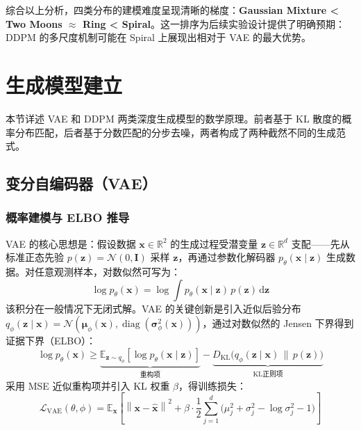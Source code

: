 \documentclass[10pt, a4paper, oneside]{ctexart}
\numberwithin{equation}{section}
\numberwithin{table}{section}
\numberwithin{figure}{section}
\newcommand{\R}{\mathbb{R}}
\newcommand{\Ncal}{\mathcal{N}}
\newcommand{\E}{\mathbb{E}}
\newcommand{\KL}{D_{\mathrm{KL}}}
\newcommand{\norm}[1]{\left\| #1 \right\|}
\newcommand{\vect}[1]{\mathbf{#1}}
\begin{document}
综合以上分析，四类分布的建模难度呈现清晰的梯度：\textbf{Gaussian Mixture < Two Moons $\approx$ Ring < Spiral}。这一排序为后续实验设计提供了明确预期：DDPM 的多尺度机制可能在 Spiral 上展现出相对于 VAE 的最大优势。

\section{生成模型建立}

本节详述 VAE 和 DDPM 两类深度生成模型的数学原理。前者基于 KL 散度的概率分布匹配，后者基于分数匹配的分步去噪，两者构成了两种截然不同的生成范式。

\subsection{变分自编码器（VAE）}

\subsubsection{概率建模与 ELBO 推导}

VAE \cite{kingma2014vae} 的核心思想是：假设数据 $\vect{x}\in\R^{2}$ 的生成过程受潜变量 $\vect{z}\in\R^{d}$ 支配——先从标准正态先验 $p(\vect{z})=\Ncal(0,\vect{I})$ 采样 $\vect{z}$，再通过参数化解码器 $p_{\theta}(\vect{x}\mid\vect{z})$ 生成数据。对任意观测样本，对数似然可写为：
\begin{equation}
    \log p_{\theta}(\vect{x}) = \log\int p_{\theta}(\vect{x}\mid\vect{z})\,p(\vect{z})\,\mathrm{d}\vect{z}
\end{equation}
该积分在一般情况下无闭式解。VAE 的关键创新是引入近似后验分布 $q_{\phi}(\vect{z}\mid\vect{x}) = \Ncal(\vect{\mu}_{\phi}(\vect{x}), \operatorname{diag}(\vect{\sigma}_{\phi}^2(\vect{x})))$，通过对数似然的 Jensen 下界得到证据下界（ELBO）：
\begin{equation}
    \log p_{\theta}(\vect{x}) \ge \underbrace{\E_{\vect{z}\sim q_{\phi}}[\log p_{\theta}(\vect{x}\mid\vect{z})]}_{\text{重构项}} - \underbrace{\KL\bigl(q_{\phi}(\vect{z}\mid\vect{x})\,\big\|\,p(\vect{z})\bigr)}_{\text{KL正则项}}
\end{equation}
采用 MSE 近似重构项并引入 KL 权重 $\beta$，得训练损失：
\begin{equation}
    \mathcal{L}_{\mathrm{VAE}}(\theta,\phi) = \E_{\vect{x}}\!\left[\norm{\vect{x} - \hat{\vect{x}}}^2 + \beta\cdot\frac{1}{2}\sum_{j=1}^{d}\bigl(\mu_j^2 + \sigma_j^2 - \log\sigma_j^2 - 1\bigr)\right]
\end{equation}
\end{document}
